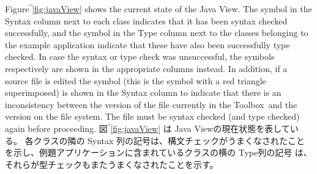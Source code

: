 \documentclass[\pformat,12pt]{jarticle}
\newcommand{\Toolbox}{Toolbox}
\newcommand{\guicmd}[1]{{\sf #1}}
\begin{document}
Figure‾\ref{fig:javaView} shows the current state of the \guicmd{Java
  View}. The symbol
in the \guicmd{Syntax} column next to each class indicates that it has
  been syntax checked successfully, and the symbol
  in the \guicmd{Type} column next to the classes belonging to the
  example application indicate that these have also been successfully
  type checked. In case the syntax or type check was unsuccessful, the
  symbols 
  respectively
are shown in the appropriate columns instead. In addition, if a source
  file is edited the symbol
  (this is the symbol 
with a red triangle superimposed)
is shown in the \guicmd{Syntax} column to indicate that there is an
  inconsistency between the version of the file 
currently in the \Toolbox\ and the version on the file system. The
file must be syntax checked (and type checked) again before proceeding.
図‾\ref{fig:javaView} は \guicmd{Java View}の現在状態を表している。 
各クラスの隣の \guicmd{Syntax} 列の記号は、構文チェックがうまくなされたことを示し、例題アプリケーションに含まれているクラスの横の \guicmd{Type}列の記号 は、それらが型チェックもまたうまくなされたことを示す。
\end{document}
